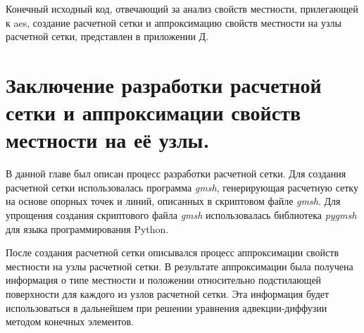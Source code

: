 Конечный исходный код, отвечающий за анализ свойств местности, прилегающей к \ac{aes}, создание расчетной сетки и 
аппроксимацию свойств местности на узлы расчетной сетки, представлен в приложении Д.

\section{Заключение разработки расчетной сетки и аппроксимации свойств местности на её узлы.}

В данной главе был описан процесс разработки расчетной сетки. Для создания расчетной сетки использовалась программа 
\textit{gmsh}, генерирующая расчетную сетку на основе опорных точек и линий, описанных в скриптовом файле \textit{gmsh}. 
Для упрощения создания скриптового файла \textit{gmsh} использовалась библиотека \textit{pygmsh} для языка 
программирования Python. 

После создания расчетной сетки описывался процесс аппроксимации свойств местности на узлы расчетной сетки. В результате 
аппроксимации была получена информация о типе местности и положении относительно подстилающей поверхности для каждого из 
узлов расчетной сетки. Эта информация будет использоваться в дальнейшем при решении уравнения адвекции-диффузии методом 
конечных элементов.   

